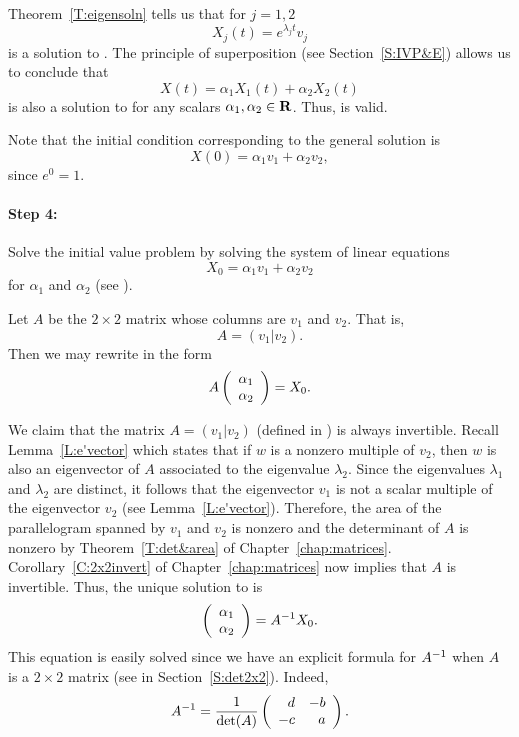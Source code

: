 Theorem~\ref{T:eigensoln} tells us that for $j=1,2$
\[
X_j(t) = e^{\lambda_j t}v_j
\]
is a solution to .  The principle of superposition (see
Section~\ref{S:IVP&E}) allows us to conclude that
\[
X(t) = \alpha_1X_1(t) + \alpha_2X_2(t)
\]
is also a solution to  for any scalars $\alpha_1,\alpha_2\in\mbox{$\bf{R}$}$.
Thus,  is valid.

Note that the initial condition corresponding to the general solution
 is
\begin{equation} \label{E:geninit}
X(0) = \alpha_1v_1 + \alpha_2v_2,
\end{equation}
since $e^0=1$.

\paragraph{Step 4:}  Solve the initial value problem by solving the system
of linear equations
\begin{equation} \label{E:geninit2}
X_0 = \alpha_1v_1 + \alpha_2v_2
\end{equation}
for $\alpha_1 $ and $\alpha_2$ (see ).

Let $A$ be the $2\times 2$ matrix whose columns are $v_1$ and $v_2$.  That
is,
\begin{equation} \label{E:Av1v2}
A = (v_1|v_2).
\end{equation}
Then we may rewrite  in the form
\begin{equation} \label{E:solveinit}
A\left(\begin{array}{r} \alpha_1 \\ \alpha_2\end{array}\right) = X_0.
\end{equation}

We claim that the matrix $A=(v_1|v_2)$ (defined in ) is always
invertible.  Recall Lemma~\ref{L:e'vector} which states that if $w$ is a 
nonzero multiple of $v_2$, then $w$ is also an eigenvector of $A$ associated to the eigenvalue $\lambda_2$.  Since the eigenvalues $\lambda_1$
and $\lambda_2$ are distinct, it follows that the eigenvector $v_1$ is not a
scalar multiple of the eigenvector $v_2$ (see Lemma~\ref{L:e'vector}).  
Therefore, the area of the
parallelogram spanned by $v_1$ and $v_2$ is nonzero and the determinant of
$A$ is nonzero by Theorem~\ref{T:det&area} of Chapter~\ref{chap:matrices}.   
Corollary~\ref{C:2x2invert} of Chapter~\ref{chap:matrices} now implies that 
$A$ is invertible.  Thus, the unique solution to  is
\[
\left(\begin{array}{r} \alpha_1 \\ \alpha_2\end{array}\right) = A^{-1} X_0.
\]
This equation is easily solved since we have an explicit formula for
$A^{-1}$ when $A$ is a $2\times 2$ matrix (see  in
Section~\ref{S:det2x2}).  Indeed,
\[
A^{-1} = \frac{1}{\det(A)}\left(\begin{array}{rr} d & -b\\ -c &a\end{array}\right).
\]

